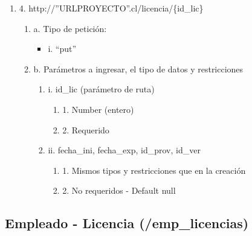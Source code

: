 \begin{enumerate}
    \item 4. http://”URLPROYECTO”.cl/licencia/\{id\_lic\}
    \begin{enumerate}
        \item a. Tipo de petición:
            \begin{itemize}
               \item i. “put”
            \end{itemize}
        \item b. Parámetros a ingresar, el tipo de datos y restricciones
            \begin{enumerate}
                \item i. id\_lic (parámetro de ruta)
                    \begin{enumerate}
                        \item 1. Number (entero)
                        \item 2. Requerido
                    \end{enumerate}
                \item ii. fecha\_ini, fecha\_exp, id\_prov, id\_ver
                    \begin{enumerate}
                        \item 1. Mismos tipos y restricciones que en la creación
                        \item 2. No requeridos - Default null
                    \end{enumerate}
            \end{enumerate}
    \end{enumerate}
\end{enumerate}

\subsection{Empleado - Licencia (/emp\_licencias)}

